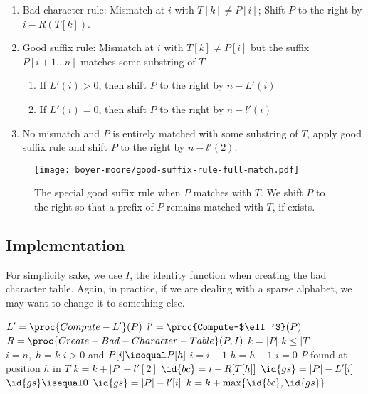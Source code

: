 \begin{enumerate}
    \item Bad character rule: Mismatch at $i$ with $T[k] \neq P[i]$; Shift $P$ to the right by $i - R(T[k])$.
    \item Good suffix rule: Mismatch at $i$ with $T[k] \neq P[i]$ but the suffix $P[i+1 \ldots n]$ matches some substring of $T$
    \begin{enumerate}
        \item If $L'(i) > 0$, then shift $P$ to the right by $n - L'(i)$
        \item If $L'(i) = 0$, then shift $P$ to the right by $n - l'(i)$ 
    \end{enumerate}
    \item No mismatch and $P$ is entirely matched with some substring of $T$, apply good suffix rule and shift $P$ to the right by $n - l'(2)$.
\end{enumerate}

\begin{figure}[htbp]
    \centering
    \texttt{[image: boyer-moore/good-suffix-rule-full-match.pdf]}
    \caption{The special good suffix rule when $P$ matches with $T$. We shift $P$ to the right so that a prefix of $P$ remains matched with $T$, if exists.}
    \label{fig:boyer-moore-good-suffix-rule-full-match}
\end{figure}

\subsection{Implementation}

For simplicity sake, we use $I$, the identity function when creating the bad character table. Again, in practice, if we are dealing with a sparse alphabet, we may want to change it to something else.

\begin{codebox}
    \li $L' = \proc{Compute-L'}(P)$
    \li $l' = \proc{Compute-$\ell'$}(P)$
    \li $R = \proc{Create-Bad-Character-Table}(P,I)$
    \li $k = |P|$
    \li \While $k \leq |T|$ \Do
        \li $i = n,\; h = k$
        \li \While $i > 0$ and $P[i] \isequal P[h]$ \Do
            \li $i = i - 1$
            \li $h = h - 1$
        \End
        \li \If $i = 0$ \Then
            \li $P$ found at position $h$ in $T$
            \li $k = k + |P| - l'[2]$
        \li \Else
            \li $\id{bc} = i - R[T[h]]$
            \li $\id{gs} = |P| - L'[i]$
            \li \If $\id{gs} \isequal 0$ \Then
                \li $\id{gs} = |P| - l'[i]$
            \End
            \li $k = k + \max\{\id{bc},\id{gs}\}$
\end{codebox}